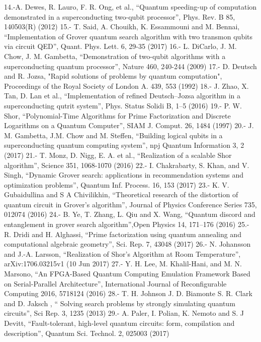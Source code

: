 14.-A. Dewes, R. Lauro, F. R. Ong, et al., “Quantum speeding-up of computation demonstrated in a superconducting two-qubit processor”, Phys. Rev. B 85, 140503(R) (2012)
15.- T. Said, A. Chouikh, K. Essammouni and M. Bennai, “Implementation of Grover quantum search algorithm with two transmon qubits via circuit QED”, Quant. Phys. Lett. 6, 29-35 (2017)
16.- L. DiCarlo, J. M. Chow, J. M. Gambetta, “Demonstration of two-qubit algorithms with a superconducting quantum processor”, Nature 460, 240-244 (2009)
17.- D. Deutsch and R. Jozsa, "Rapid solutions of problems by quantum computation", Proceedings of the Royal Society of London A. 439, 553 (1992)
18.- J. Zhao, X. Tan, D. Lan et al., “Implementation of refined Deutsch–Jozsa algorithm in a superconducting qutrit system”, Phys. Status Solidi B, 1–5 (2016)
19.- P. W. Shor, “Polynomial-Time Algorithms for Prime Factorization and Discrete Logarithms on a Quantum Computer”, SIAM J. Comput. 26, 1484 (1997)
20.- J. M. Gambetta, J.M. Chow and M. Steffen, “Building logical qubits in a superconducting quantum computing system”, npj Quantum Information 3, 2 (2017)
21.- T. Monz, D. Nigg, E. A. et al., “Realization of a scalable Shor algorithm”, Science 351, 1068-1070 (2016)
22.- I. Chakrabarty, S. Khan, and V. Singh, “Dynamic Grover search: applications in recommendation systems and optimization problems”, Quantum Inf. Process. 16, 153 (2017)
23.- K. V. Gubaidullina and S A Chivilikhin, “Theoretical research of the distortion of quantum circuit in Grover's algorithm”, Journal of Physics Conference Series 735, 012074 (2016)
24.- B. Ye, T. Zhang, L. Qiu and X. Wang, “Quantum discord and entanglement in grover search algorithm”,Open Physics 14, 171–176 (2016)
25.- R. Dridi and H. Alghassi, “Prime factorization using quantum annealing and computational algebraic geometry”, Sci. Rep. 7, 43048 (2017)
26.- N. Johansson and J.-A. Larsson, “Realization of Shor’s Algorithm at Room Temperature”, arXiv:1706.03215v1 (10 Jun 2017)
27.- Y. H. Lee, M. Khalil-Hani, and M. N. Marsono, “An FPGA-Based Quantum Computing Emulation Framework Based on Serial-Parallel Architecture”, International Journal of Reconfigurable Computing 2016, 5718124 (2016)
28.- T. H. Johnson J. D. Biamonte S. R. Clark and D. Jaksch , “ Solving search problems by strongly simulating quantum circuits”, Sci Rep. 3, 1235 (2013)
29.- A. Paler, I. Polian, K. Nemoto and S. J Devitt, “Fault-tolerant, high-level quantum circuits: form, compilation and description”, Quantum Sci. Technol. 2, 025003 (2017)

